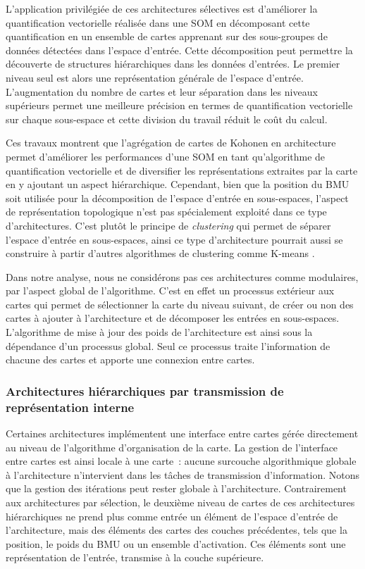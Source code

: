 \documentclass[../main]{subfiles}
\begin{document}
L'application privilégiée de ces architectures sélectives est d'améliorer la quantification vectorielle réalisée dans une SOM en décomposant cette quantification en un ensemble de cartes apprenant sur des sous-groupes de données détectées dans l'espace d'entrée.
Cette décomposition peut permettre la découverte de structures hiérarchiques dans les données d'entrées.
Le premier niveau seul est alors une représentation générale de l'espace d'entrée. L'augmentation du nombre de cartes et leur séparation dans les niveaux supérieurs permet une meilleure précision en termes de quantification vectorielle sur chaque sous-espace et cette division du travail réduit le coût du calcul.

Ces travaux montrent que l'agrégation de cartes de Kohonen en architecture permet d'améliorer les performances d'une SOM en tant qu'algorithme de quantification vectorielle et de diversifier les représentations extraites par la carte en y ajoutant un aspect hiérarchique.
Cependant, bien que la position du BMU soit utilisée pour la décomposition de l'espace d'entrée en sous-espaces, l'aspect de représentation topologique n'est pas spécialement exploité dans ce type d'architectures.
C'est plutôt le principe de \emph{clustering} qui permet de séparer l'espace d'entrée en sous-espaces, ainsi ce type d'architecture pourrait aussi se construire à partir d'autres algorithmes de clustering comme K-means \parencite{1094577}.

Dans notre analyse, nous ne considérons pas ces architectures comme modulaires, par l'aspect global de l'algorithme.
C'est en effet un processus extérieur aux cartes qui permet de sélectionner la carte du niveau suivant, de créer ou non des cartes à ajouter à l'architecture et de décomposer les entrées en sous-espaces. L'algorithme de mise à jour des poids de l'architecture est ainsi sous la dépendance d'un processus global.
Seul ce processus traite l'information de chacune des cartes et apporte une connexion entre cartes.

\subsubsection{Architectures hiérarchiques par transmission de représentation interne}

Certaines architectures implémentent une interface entre cartes gérée directement au niveau de l'algorithme d'organisation de la carte. La gestion de l'interface entre cartes est ainsi locale à une carte~: aucune surcouche algorithmique globale à l'architecture n'intervient dans les tâches de transmission d'information. Notons que la gestion des itérations peut rester globale à l'architecture.
Contrairement aux architectures par sélection, le deuxième niveau de cartes de ces architectures hiérarchiques ne prend plus comme entrée un élément de l'espace d'entrée de l'architecture, mais des éléments des cartes des couches précédentes, tels que la position, le poids du BMU ou un ensemble d'activation.
Ces éléments sont une représentation de l'entrée, transmise à la couche supérieure.
\end{document}
